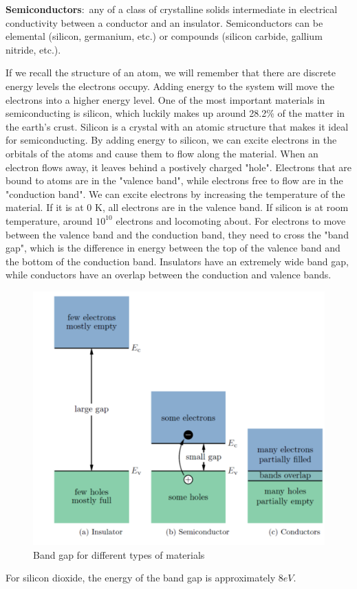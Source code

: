 \documentclass[nobib]{tufte-handout}
\newcommand{\defn}[2]{\noindent\textbf{#1}:\ #2}
\begin{document}
\defn{Semiconductors}{any of a class of crystalline 
solids intermediate in electrical conductivity 
between a conductor and an insulator}. 
Semiconductors can be elemental (silicon, germanium, etc.) or 
compounds (silicon carbide, gallium nitride, etc.). 

If we recall the structure of an atom, we will remember that 
there are discrete energy levels the electrons occupy. Adding energy to the system will 
move the electrons into a higher energy level. 
One of the most important materials in semiconducting is silicon, 
which luckily makes up around 28.2\% of the matter in the earth's crust. 
Silicon is a crystal with an atomic structure that makes it ideal 
for semiconducting. By adding energy to silicon, we can excite 
electrons in the orbitals of the atoms and cause them to flow along 
the material. When an electron flows away, it leaves behind a postively 
charged "hole". Electrons that are bound to atoms are in the "valence band",
while electrons free to flow are in the "conduction band". 
We can excite electrons by increasing the temperature 
of the material. If it is at 0 K, all electrons are 
in the valence band. If silicon is at room temperature, 
around $10^10$ electrons and locomoting about. 
For electrons to move between the valence
band and the conduction band, they need to cross the "band gap", 
which is the difference in energy between the top of the 
valence band and the bottom of the conduction band. Insulators have an 
extremely wide band gap, while conductors have an overlap 
between the conduction and valence bands. 
\begin{figure}
    \center
    \caption{Band gap for different types of materials}
    \includegraphics{images/bandgap}
\end{figure}
For silicon dioxide, the energy of the band gap is approximately 
$8 eV$. 
\end{document}
